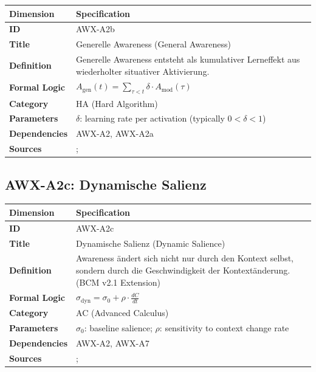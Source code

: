 \begin{table}[htbp]
\small
\begin{tabular}{p{3cm}p{11cm}}
\toprule
\textbf{Dimension} & \textbf{Specification} \\
\midrule
\textbf{ID} & AWX-A2b \\
\textbf{Title} & Generelle Awareness (General Awareness) \\
\textbf{Definition} & Generelle Awareness entsteht als kumulativer Lerneffekt aus wiederholter situativer Aktivierung. \\
\textbf{Formal Logic} & $A_{\text{gen}}(t) = \sum_{\tau < t} \delta \cdot A_{\text{mod}}(\tau)$ \\
\textbf{Category} & HA (Hard Algorithm) \\
\textbf{Parameters} & $\delta$: learning rate per activation (typically $0 < \delta < 1$) \\
\textbf{Dependencies} & AWX-A2, AWX-A2a \\
\textbf{Sources} & \citet{arrow1962learning}; \citet{kandori1993learning} \\
\bottomrule
\end{tabular}
\end{table}


\subsection{AWX-A2c: Dynamische Salienz}

\begin{table}[htbp]
\small
\begin{tabular}{p{3cm}p{11cm}}
\toprule
\textbf{Dimension} & \textbf{Specification} \\
\midrule
\textbf{ID} & AWX-A2c \\
\textbf{Title} & Dynamische Salienz (Dynamic Salience) \\
\textbf{Definition} & Awareness ändert sich nicht nur durch den Kontext selbst, sondern durch die Geschwindigkeit der Kontextänderung. (BCM v2.1 Extension) \\
\textbf{Formal Logic} & $\sigma_{\text{dyn}} = \sigma_0 + \rho \cdot \frac{dC}{dt}$ \\
\textbf{Category} & AC (Advanced Calculus) \\
\textbf{Parameters} & $\sigma_0$: baseline salience; $\rho$: sensitivity to context change rate \\
\textbf{Dependencies} & AWX-A2, AWX-A7 \\
\textbf{Sources} & \citet{PAP-bordalo2012salience}; \citet{bordalo2013salience} \\
\bottomrule
\end{tabular}
\end{table}

